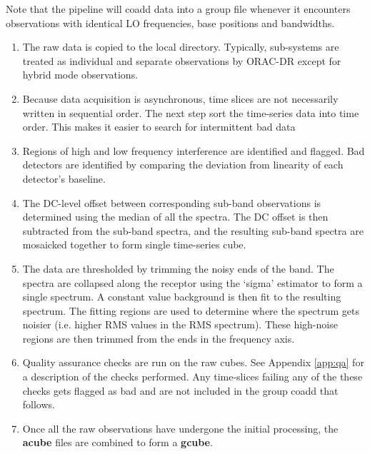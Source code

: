 \documentclass[twoside,11pt]{article}
\renewcommand{\_}{\texttt{\symbol{95}}}
\begin{document}
Note that the pipeline will coadd data into a group file whenever it encounters observations with identical LO frequencies, base positions and bandwidths. 

\begin{enumerate}[label=(\textbf{\arabic*})]

\item  The raw data is copied to the local directory. Typically, sub-systems are treated as individual and separate observations by ORAC-DR except for hybrid mode observations.

\item Because data acquisition is asynchronous, time slices are not necessarily written in sequential order. The next step sort the time-series data into time order. This makes it easier to search for intermittent bad data

\item  Regions of high and low frequency interference are identified and flagged. Bad detectors are identified by comparing the deviation from linearity of each detector's baseline.

\item   The DC-level offset between corresponding sub-band observations is determined using the median of all the spectra.  The DC offset is then subtracted from the sub-band spectra, and the resulting sub-band spectra are mosaicked together to form single time-series cube.

\item   The data are thresholded by trimming the noisy ends of the band. The spectra are collapsed along the receptor using the `sigma' estimator to form a single spectrum. A constant value background is then fit to the resulting spectrum. The fitting regions are used to determine where the spectrum gets noisier (i.e. higher RMS values in the RMS spectrum). These high-noise regions are then trimmed from the ends in the frequency axis. 

\item  Quality assurance checks are run on the raw cubes. See Appendix \ref{app:qa} for a description of the checks performed. Any time-slices failing any of the these checks gets flagged as bad and are not included in the group coadd that follows.

\item  Once all the raw observations have undergone the initial processing, the \textbf{a\_cube} files are combined to form a \textbf{g\_cube}. 


\end{enumerate}
\end{document}
